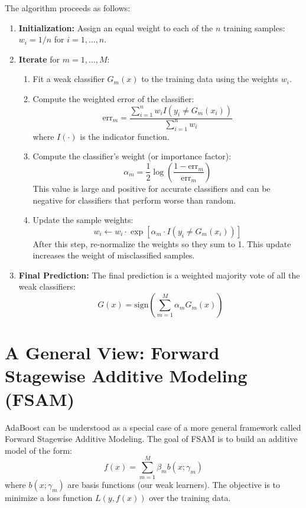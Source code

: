 \documentclass{article}
\begin{document}
\begin{multicols}{2}
The algorithm proceeds as follows:
\begin{enumerate}
    \item \textbf{Initialization:} Assign an equal weight to each of the $n$ training samples: $w_i = 1/n$ for $i=1, \dots, n$.
    \item \textbf{Iterate} for $m = 1, \dots, M$:
    \begin{enumerate}
        \item Fit a weak classifier $G_m(x)$ to the training data using the weights $w_i$.
        \item Compute the weighted error of the classifier: 
        $$ \text{err}_m = \frac{\sum_{i=1}^{n} w_i I(y_i \neq G_m(x_i))}{\sum_{i=1}^{n} w_i} $$
        where $I(\cdot)$ is the indicator function.
        \item Compute the classifier's weight (or importance factor):
        $$ \alpha_m = \frac{1}{2}\log\left(\frac{1 - \text{err}_m}{\text{err}_m}\right) $$
        This value is large and positive for accurate classifiers and can be negative for classifiers that perform worse than random.
        \item Update the sample weights:
        $$ w_i \leftarrow w_i \cdot \exp[\alpha_m \cdot I(y_i \neq G_m(x_i))] $$
        After this step, re-normalize the weights so they sum to 1. This update increases the weight of misclassified samples.
    \end{enumerate}
    \item \textbf{Final Prediction:} The final prediction is a weighted majority vote of all the weak classifiers:
    $$ G(x) = \text{sign}\left(\sum_{m=1}^{M} \alpha_m G_m(x)\right) $$
\end{enumerate}

\section{A General View: Forward Stagewise Additive Modeling (FSAM)}
AdaBoost can be understood as a special case of a more general framework called Forward Stagewise Additive Modeling. The goal of FSAM is to build an additive model of the form:
$$ f(x) = \sum_{m=1}^{M} \beta_m b(x; \gamma_m) $$
where $b(x; \gamma_m)$ are basis functions (our weak learners). The objective is to minimize a loss function $L(y, f(x))$ over the training data.


\end{multicols}
\end{document}
